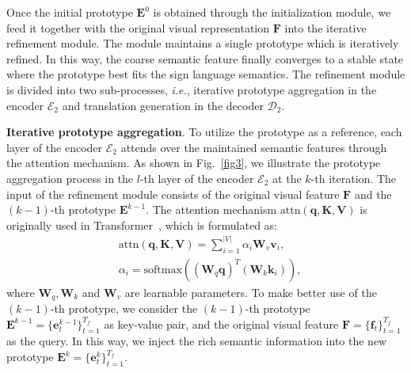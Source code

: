 \documentclass[10pt,twocolumn,letterpaper]{article}
\begin{document}
    Once the initial prototype $\bm{E}^0$ is obtained through the initialization module, we feed it together with the original visual representation $\bm{F}$ into the iterative refinement module. The module maintains a single prototype which is iteratively refined. In this way, the coarse semantic feature finally converges to a stable state where the prototype best fits the sign language semantics. The refinement module is divided into two sub-processes, \emph{i.e.}, iterative prototype aggregation in the encoder $\mathcal{E}_2$ and translation generation in the decoder $\mathcal{D}_2$.

    \smallskip
    \noindent \textbf{Iterative prototype aggregation}.
    To utilize the prototype as a reference, each layer of the encoder $\mathcal{E}_2$ attends over the maintained semantic features through the attention mechanism. 
    As shown in Fig.~\ref{fig3}, we illustrate the prototype aggregation process in the $l$-th layer of the encoder $\mathcal{E}_2$ at the $k$-th iteration. 
    The input of the refinement module consists of the original visual feature $\bm{F}$ and the $(k-1)$-th prototype $\bm{E}^{k-1}$. The attention mechanism $\text{attn}(\bm{q},\bm{K},\bm{V})$ is originally used in Transformer~\cite{vaswani2017attention}, which is formulated as:\vspace{-1mm}
    \begin{equation}
    \begin{aligned}
    \label{equ:3}
    &\text{attn}(\bm{q},\bm{K},\bm{V})=\sum_{i=1}^{\left | V \right | } \alpha_i\bm{W}_v\bm{v}_i, \\
    &\alpha_i=\text{softmax}((\bm{W}_q\bm{q})^T(\bm{W}_k\bm{k}_i)),
    \end{aligned}
    \end{equation}
    where $\bm{W}_q,\bm{W}_k$ and $\bm{W}_v$ are learnable parameters. To make better use of the $(k-1)$-th prototype, we consider the $(k-1)$-th prototype $\bm{E}^{k-1}=\{\bm{e}_t^{k-1}\}_{t=1}^{T_f}$ as key-value pair, and the original visual feature $\bm{F}=\{\bm{f}_t\}_{t=1}^{T_f}$ as the query. In this way, we inject the rich semantic information into the new prototype $\bm{E}^{k}=\{\bm{e}_t^{k}\}_{t=1}^{T_f}$.
    
\end{document}
